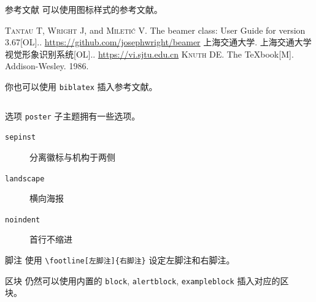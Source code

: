 \documentclass{ctexbeamer}
\begin{document}
\begin{frame}[fragile]
\begin{columns}[T]
\begin{column}{.45\textwidth}
\begin{stampblock}{参考文献}
        可以使用图标样式的参考文献。

        \begin{bibliolist}{00}
          \onlineitem \textsc{Tantau T}, \textsc{Wright J}, and
          \textsc{Mileti\'c V}.\newblock
          The beamer class: User Guide for version 3.67[OL].. \url{https://github.com/josephwright/beamer}
          \articleitem \textsc{上海交通大学}.\newblock
          上海交通大学视觉形象识别系统[OL].. \url{https://vi.sjtu.edu.cn}
          \bookitem \textsc{Knuth DE}.\newblock
          The \TeX{}book[M].\newblock
          Addison-Wesley. 1986.
        \end{bibliolist}

        你也可以使用 \texttt{biblatex} 插入参考文献。

        \printbibliography

      \end{stampblock}

    \end{column}
  \end{columns}

  \posterstamphrule[cprimary]

  \begin{columns}
    \begin{column}{0.45\textwidth}
      \begin{block}{选项}
        \texttt{poster} 子主题拥有一些选项。
        \begin{description}
          \item[\texttt{sepinst}] 分离徽标与机构于两侧
          \item[\texttt{landscape}] 横向海报
          \item[\texttt{noindent}] 首行不缩进
        \end{description}
      \end{block}
      \begin{alertblock}{脚注}
        使用 \texttt{\textbackslash{}footline[左脚注]\{右脚注\}} 设定左脚注和右脚注。
      \end{alertblock}
      \begin{exampleblock}{区块}
        仍然可以使用内置的 \texttt{block}, \texttt{alertblock}, \texttt{exampleblock}
        插入对应的区块。
      \end{exampleblock}
    \end{column}
    \begin{column}{0.45\textwidth}


\end{column}
\end{columns}
\end{frame}
\end{document}
